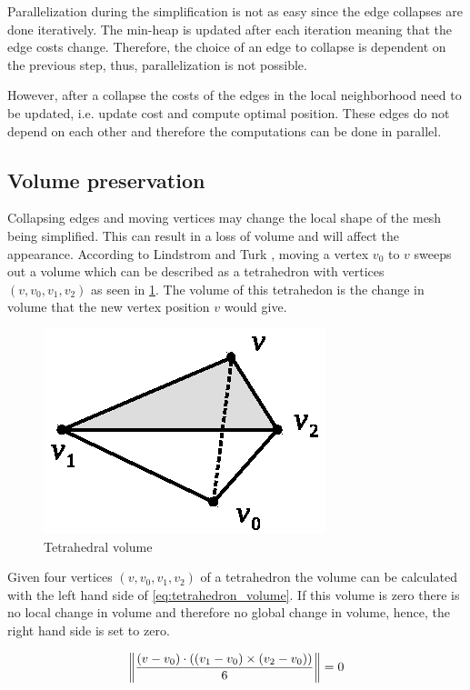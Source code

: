 Parallelization during the simplification is not as easy since the edge collapses are done iteratively. The min-heap is updated after each iteration meaning that the edge costs change. Therefore, the choice of an edge to collapse is dependent on the previous step, thus, parallelization is not possible.

However, after a collapse the costs of the edges in the local neighborhood need to be updated, i.e. update cost and compute optimal position. These edges do not depend on each other and therefore the computations can be done in parallel.

\subsection{Volume preservation} \label{sec:volume_preservation}
Collapsing edges and moving vertices may change the local shape of the mesh being simplified. This can result in a loss of volume and will affect the appearance. According to Lindstrom and Turk \cite{lindstrom1998fast} , moving a vertex $v_0$ to $v$ sweeps out a volume which can be described as a tetrahedron with vertices $(v, v_0, v_1, v_2)$ as seen in \cref{fig:tetrahedron}. The volume of this tetrahedon is the change in volume that the new vertex position $v$ would give. 

\begin{figure}[h]
    \centering
    \includegraphics[width=.5\textwidth]{figures/tetrahedron.eps}
    \caption{Tetrahedral volume}
    \label{fig:tetrahedron}
\end{figure}

Given four vertices $(v, v_0, v_1, v_2)$ of a tetrahedron the volume can be calculated with the left hand side of \cref{eq:tetrahedron_volume}. If this volume is zero there is no local change in volume and therefore no global change in volume, hence, the right hand side is set to zero.

\begin{equation} \label{eq:tetrahedron_volume}
\norm*{\frac{(v - v_0) \cdot ((v_1-v_0) \times (v_2 - v_0))}{6}} = 0
\end{equation}

